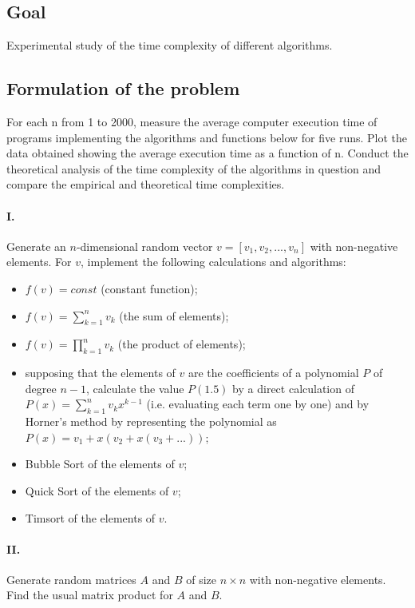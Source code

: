 \newpage
\subsection{Goal}

Experimental study of the time complexity of different algorithms.

\subsection{Formulation of the problem}

For each n from 1 to 2000, measure the average computer execution time of programs implementing the algorithms and functions below for five runs.
Plot the data obtained showing the average execution time as a function of n. Conduct the theoretical analysis of the time complexity of the algorithms in question and compare the empirical and theoretical time complexities.

\paragraph{I.}
Generate an $n$-dimensional random vector $v=[v_1,v_2,...,v_n]$ with non-negative elements.
For $v$, implement the following calculations and algorithms:
\begin{itemize}
    \item $f(v) = const$ (constant function);
    \item $f(v) = \sum^{n}_{k = 1}{v_k}$ (the sum of elements);
    \item $f(v) = \prod^{n}_{k = 1}{v_k}$ (the product of elements);
    \item supposing that the elements of $v$ are the coefficients of a polynomial $P$ of degree $n - 1$, calculate the value $P(1.5)$ by a direct calculation of $P(x) = \sum^{n}_{k = 1}{v_kx^{k - 1}}$ (i.e. evaluating each term one by one) and by Horner's method by representing the polynomial as $P(x) = v_1 + x(v_2 + x(v_3 + ...))$;
    \item Bubble Sort of the elements of $v$;
    \item Quick Sort of the elements of $v$;
    \item Timsort of the elements of $v$.
\end{itemize}

\paragraph{II.}
Generate random matrices $A$ and $B$ of size $n \times n$ with non-negative elements. Find the usual matrix product for $A$ and $B$.

